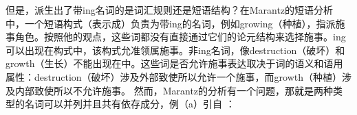     但是，派生出了带ing名词的是词汇规则还是短语结构？在Marantz的\citeyearpar{Marantz97a}短语分析中，一个短语构式（表示成\vPc）负责为带ing的名词，例如growing（种植），指派施事角色。按照他的观点，这些词都没有直接通过它们的论元结构来选择施事。ing可以出现在\vPc 构式中，该构式允准领属施事。非ing名词，像destruction（破坏）和growth（生长）不能出现在\vPc 中。这些词是否允许施事表达取决于词的语义和语用属性：destruction（破坏）涉及外部致使所以允许一个施事，而growth（种植）涉及内部致使所以不允许施事。
    然而，Marantz的分析有一个问题，那就是两种类型的名词可以并列并且共有依存成分，例（a）引自 ：

